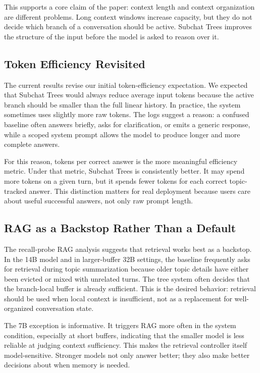 \documentclass[pdflatex,sn-mathphys-num]{sn-jnl}%
\theoremstyle{thmstyleone}%
\theoremstyle{thmstyletwo}%
\theoremstyle{thmstylethree}%
\begin{document}
This supports a core claim of the paper: context length and context organization are different problems. Long context windows increase capacity, but they do not decide which branch of a conversation should be active. Subchat Trees improves the structure of the input before the model is asked to reason over it.

\subsection{Token Efficiency Revisited}\label{subsec:token_efficiency_revisited}

The current results revise our initial token-efficiency expectation. We expected that Subchat Trees would always reduce average input tokens because the active branch should be smaller than the full linear history. In practice, the system sometimes uses slightly more raw tokens. The logs suggest a reason: a confused baseline often answers briefly, asks for clarification, or emits a generic response, while a scoped system prompt allows the model to produce longer and more complete answers.

For this reason, tokens per correct answer is the more meaningful efficiency metric. Under that metric, Subchat Trees is consistently better. It may spend more tokens on a given turn, but it spends fewer tokens for each correct topic-tracked answer. This distinction matters for real deployment because users care about useful successful answers, not only raw prompt length.

\subsection{RAG as a Backstop Rather Than a Default}\label{subsec:rag_backstop_discussion}

The recall-probe RAG analysis suggests that retrieval works best as a backstop. In the 14B model and in larger-buffer 32B settings, the baseline frequently asks for retrieval during topic summarization because older topic details have either been evicted or mixed with unrelated turns. The tree system often decides that the branch-local buffer is already sufficient. This is the desired behavior: retrieval should be used when local context is insufficient, not as a replacement for well-organized conversation state.

The 7B exception is informative. It triggers RAG more often in the system condition, especially at short buffers, indicating that the smaller model is less reliable at judging context sufficiency. This makes the retrieval controller itself model-sensitive. Stronger models not only answer better; they also make better decisions about when memory is needed.
\end{document}
